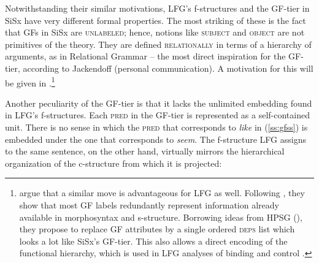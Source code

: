 \documentclass[output=paper,hidelinks]{langscibook}
\begin{document}
Notwithstanding their similar motivations, LFG's f-structures and the GF-tier in SiSx have very different formal properties. The most striking of these is the fact that GFs in SiSx are \textsc{unlabeled}; hence, notions like \textsc{subject} and \textsc{object} are not primitives of the theory. They are defined \textsc{relationally} in terms of a hierarchy of arguments, as in Relational Grammar \citep{perlmutter1977toward, perlmutter1983some} -- the most direct inspiration for the GF-tier, according to Jackendoff (personal communication). A motivation for this will be given in .\footnote{\citet{patejuk2016reducing} argue that a similar move is advantageous for LFG as well.  Following  \citet{alsina1996the-role}, they show that most GF labels redundantly represent information already available in morphosyntax and s-structure. Borrowing ideas from HPSG (), they propose to replace GF attributes by a single ordered \textsc{deps} list which looks a lot like SiSx's GF-tier. This also allows a direct encoding of the functional hierarchy, which is used in LFG analyses of binding \citep{falk2001lexical} and control \citep{bresnan1982control-complementation}.} 

Another peculiarity of the GF-tier is that it lacks the unlimited embedding found in LFG's f-structures. Each \textsc{pred} in the GF-tier is represented as a self-contained unit.  There is no sense in which the \textsc{pred} that corresponds to \textit{like}  in (\ref{ss:gfss})  is embedded under the one that corresponds to \textit{seem}. The f-structure LFG assigns to the same sentence, on the other hand,  virtually mirrors the hierarchical organization of the c-structure from which it is projected:

\end{document}
